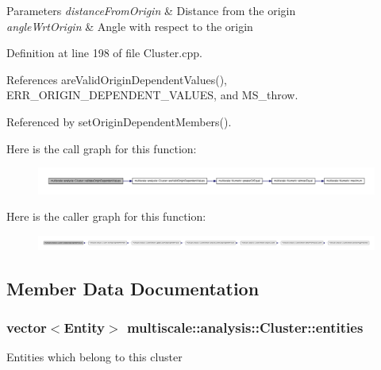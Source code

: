 \begin{DoxyParams}{\-Parameters}
{\em distance\-From\-Origin} & \-Distance from the origin \\
\hline
{\em angle\-Wrt\-Origin} & \-Angle with respect to the origin \\
\hline
\end{DoxyParams}


\-Definition at line 198 of file \-Cluster.\-cpp.



\-References are\-Valid\-Origin\-Dependent\-Values(), \-E\-R\-R\-\_\-\-O\-R\-I\-G\-I\-N\-\_\-\-D\-E\-P\-E\-N\-D\-E\-N\-T\-\_\-\-V\-A\-L\-U\-E\-S, and \-M\-S\-\_\-throw.



\-Referenced by set\-Origin\-Dependent\-Members().



\-Here is the call graph for this function\-:\nopagebreak
\begin{figure}[H]
\begin{center}
\leavevmode
\includegraphics[width=350pt]{classmultiscale_1_1analysis_1_1Cluster_a26b9c11e63bfdbfc837a35f68c5c40dd_cgraph}
\end{center}
\end{figure}




\-Here is the caller graph for this function\-:\nopagebreak
\begin{figure}[H]
\begin{center}
\leavevmode
\includegraphics[width=350pt]{classmultiscale_1_1analysis_1_1Cluster_a26b9c11e63bfdbfc837a35f68c5c40dd_icgraph}
\end{center}
\end{figure}




\subsection{\-Member \-Data \-Documentation}
\hypertarget{classmultiscale_1_1analysis_1_1Cluster_a820298479651328fb79d92a65f7923d6}{
\subsubsection[{entities}]{\setlength{\rightskip}{0pt plus 5cm}vector$<${\bf \-Entity}$>$ {\bf multiscale\-::analysis\-::\-Cluster\-::entities}}}\label{classmultiscale_1_1analysis_1_1Cluster_a820298479651328fb79d92a65f7923d6}
\-Entities which belong to this cluster 

